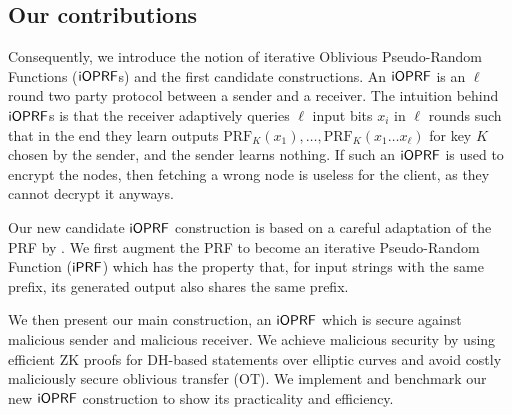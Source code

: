 \subsection{Our contributions} Consequently, we introduce the notion
of iterative Oblivious Pseudo-Random Functions ($\mathsf{i}\mathsf{OPRF}$s) and the
first candidate constructions. An $\mathsf{i}\mathsf{OPRF}$ is an $\ell$ round two
party protocol between a sender and a receiver. The intuition behind
$\mathsf{i}\mathsf{OPRF}$s is that the receiver adaptively queries $\ell$ input bits
$x_i$ in $\ell$ rounds such that in the end they learn outputs
$\text{PRF}_K(x_1),\ldots,\text{PRF}_K(x_1\ldots{}x_\ell)$ for key $K$
chosen by the sender, and the sender learns nothing. If such an
$\mathsf{i}\mathsf{OPRF}$ is used to encrypt the nodes, then fetching a wrong node is
useless for the client, as they cannot decrypt it anyways.

Our new candidate $\mathsf{i}\mathsf{OPRF}$ construction is based on a careful
adaptation of the PRF by \citet{prf}. We first augment the
\citeauthor{prf} PRF to become an iterative Pseudo-Random Function
($\mathsf{i}\mathsf{PRF}$) which has the property that, for input strings with the same
prefix, its generated output also shares the same prefix.
We then present our main
construction, an $\mathsf{i}\mathsf{OPRF}$ which is secure against malicious sender and
malicious receiver. We achieve malicious security by using efficient
ZK proofs for DH-based statements over elliptic curves and
avoid costly maliciously secure oblivious transfer (OT).  We implement
and benchmark our new $\mathsf{i}\mathsf{OPRF}$ construction to show its practicality
and efficiency.



